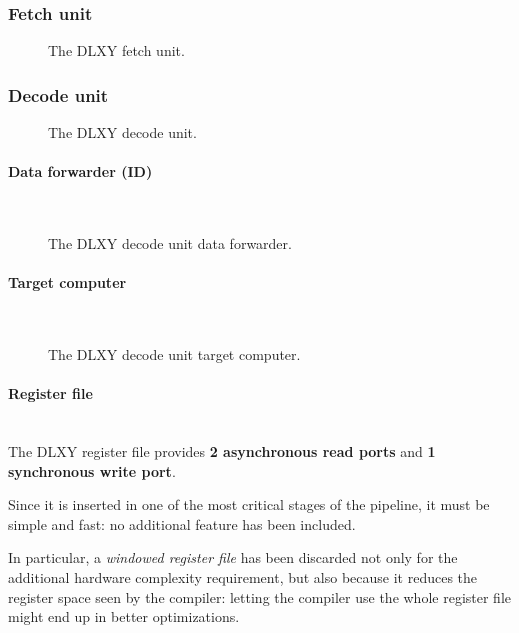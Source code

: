 \subsubsection{Fetch unit}
\begin{figure}[H]
	\centering
	\caption{The DLXY fetch unit.}
	\label{fig:fetch_unit}
\end{figure}
\subsubsection{Decode unit}
\begin{figure}[H]
	\centering
	\caption{The DLXY decode unit.}
	\label{fig:decode_unit}
\end{figure}
\paragraph{Data forwarder (ID)} \mbox{} \\
\begin{figure}[H]
	\centering
	\caption{The DLXY decode unit data forwarder.}
	\label{fig:id_fwd}
\end{figure}
\paragraph{Target computer} \mbox{} \\
\begin{figure}[H]
	\centering
	\caption{The DLXY decode unit target computer.}
	\label{fig:target_computer}
\end{figure}
\paragraph{Register file} \mbox{} \\
The DLXY register file provides \textbf{2 asynchronous read ports} and
\textbf{1 synchronous write port}.

\bigskip
Since it is inserted in one of the most critical stages of the pipeline, it must
be simple and fast: no additional feature has been included.

In particular, a \textit{windowed register file} has been discarded not only for
the additional hardware complexity requirement, but also because it reduces the
register space seen by the compiler: letting the compiler use the whole register
file might end up in better optimizations.

